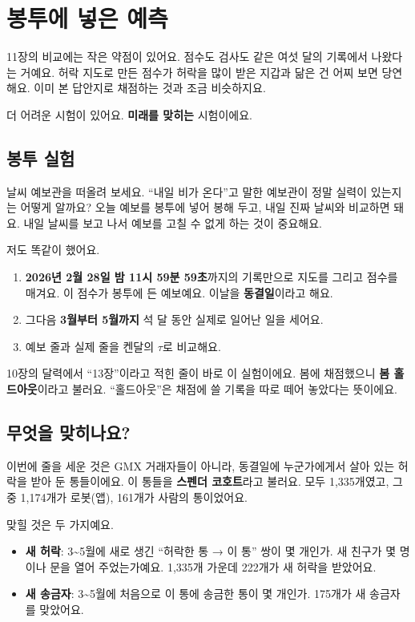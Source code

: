 \chapter{봉투에 넣은 예측}

11장의 비교에는 작은 약점이 있어요.
점수도 검사도 같은 여섯 달의 기록에서 나왔다는 거예요.
허락 지도로 만든 점수가 허락을 많이 받은 지갑과 닮은 건 어찌 보면 당연해요.
이미 본 답안지로 채점하는 것과 조금 비슷하지요.

더 어려운 시험이 있어요.
\textbf{미래를 맞히는} 시험이에요.

\section{봉투 실험}

날씨 예보관을 떠올려 보세요.
“내일 비가 온다”고 말한 예보관이 정말 실력이 있는지는 어떻게 알까요?
오늘 예보를 봉투에 넣어 봉해 두고, 내일 진짜 날씨와 비교하면 돼요.
내일 날씨를 보고 나서 예보를 고칠 수 없게 하는 것이 중요해요.

저도 똑같이 했어요.

\begin{enumerate}
\item \textbf{2026년 2월 28일 밤 11시 59분 59초}까지의 기록만으로 지도를 그리고 점수를 매겨요.
      이 점수가 봉투에 든 예보예요. 이날을 \textbf{동결일}이라고 해요.
\item 그다음 \textbf{3월부터 5월까지} 석 달 동안 실제로 일어난 일을 세어요.
\item 예보 줄과 실제 줄을 켄달의 $\tau$로 비교해요.
\end{enumerate}

10장의 달력에서 “13장”이라고 적힌 줄이 바로 이 실험이에요.
봄에 채점했으니 \textbf{봄 홀드아웃}이라고 불러요.
“홀드아웃”은 채점에 쓸 기록을 따로 떼어 놓았다는 뜻이에요.

\section{무엇을 맞히나요?}

이번에 줄을 세운 것은 GMX 거래자들이 아니라, 동결일에 누군가에게서 살아 있는 허락을 받아 둔 통들이에요.
이 통들을 \textbf{스펜더 코호트}라고 불러요.
모두 1,335개였고, 그중 1,174개가 로봇(앱), 161개가 사람의 통이었어요.

맞힐 것은 두 가지예요.

\begin{itemize}
\item \textcolor{allowcol}{\textbf{새 허락}}: 3\textasciitilde{}5월에 새로 생긴 “허락한 통 → 이 통” 쌍이 몇 개인가.
      새 친구가 몇 명이나 문을 열어 주었는가예요. 1,335개 가운데 222개가 새 허락을 받았어요.
\item \textcolor{sendcol}{\textbf{새 송금자}}: 3\textasciitilde{}5월에 처음으로 이 통에 송금한 통이 몇 개인가.
      175개가 새 송금자를 맞았어요.
\end{itemize}

